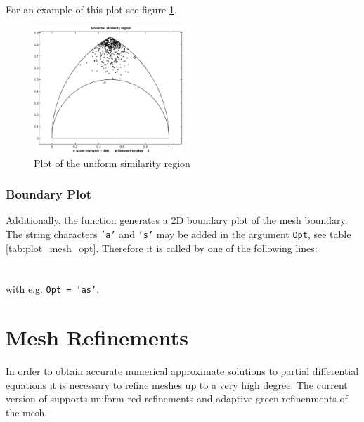  \\ %

 For an example of this plot see figure \ref{fig:USR}.

\begin{figure}[htb]
  \centering
  \includegraphics[width=0.5\textwidth]{usr.eps}
  \caption{Plot of the uniform similarity region}
  \label{fig:USR}
\end{figure}


\subsubsection{Boundary Plot} 

 Additionally, the function  generates a 2D boundary plot of the mesh boundary. The string characters {\tt 'a'} and {\tt 's'} may be added in the argument {\tt Opt}, see table \ref{tab:plot_mesh_opt}. Therefore it is called by one of the following lines: \\

 \\
 \\

 with e.g. {\tt Opt = 'as'}.


\section{Mesh Refinements} 
\label{sect:MR}

 In order to obtain accurate numerical approximate solutions to partial differential equations it is necessary to refine meshes up to a very high degree. The current version of \LIBNAME supports uniform red refinements and adaptive green refinenments of the mesh.


